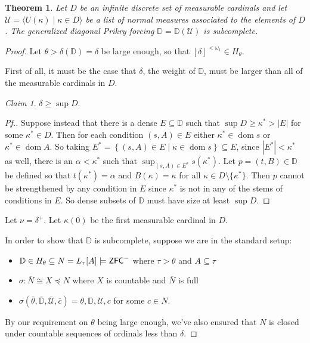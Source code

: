 \documentclass{amsart}
\newtheorem{theorem}{Theorem}[section]
\theoremstyle{definition}
\theoremstyle{remark}
\newtheorem{claimno}{Claim}
\newcommand{\D}{\mathbb{D}}
\newcommand{\N}{{\overline{N}}}
\newcommand{\U}{\mathcal{U}}
\newcommand{\ZFC}{\textup{\ensuremath{\textsf{ZFC}}}}
\DeclareMathOperator{\otp}{otp}
\DeclareMathOperator{\dom}{dom}
\newcommand{\st}{\; | \;}
\newcommand{\set}[2]{\left\{#1\st #2 \right\}}
\begin{document}
\begin{theorem} Let $D$ be an infinite discrete set of measurable cardinals %
and let $\U = \langle U(\kappa) \;|\; \kappa \in D \rangle$ be a list of normal measures associated to the
elements of $D$. 
The generalized diagonal Prikry forcing $\D=\D(\U)$ is subcomplete. \end{theorem}
\begin{proof} 
Let $\theta > \delta(\D) =\delta$ be large enough, so that $[\delta]^{<\omega_1} \in H_\theta$. 

First of all, it must be the case that $\delta$, the weight of $\D$, must be larger than all of the measurable cardinals in $D$.
\begin{claimno} $\delta \geq \sup D$. \end{claimno}
\begin{proof}[Pf.] Suppose instead that there is a dense $E \subseteq \D$ such that $\sup D \geq \kappa^* >|E|$ for some $\kappa^* \in D$. Then for each condition $(s,A) \in E$ either $\kappa^* \in \dom s$ or $\kappa^* \in \dom A$. So taking $E^*=\set{ (s, A) \in E }{ \kappa \in \dom s } \subseteq E$, since $|E^*| < \kappa^*$ as well, there is an $\alpha<\kappa^*$ such that $\sup_{(s,A) \in E^*} s(\kappa^*)$. Let $p=(t, B) \in \D$ be defined so that $t(\kappa^*)=\alpha$ and $B(\kappa)=\kappa$ for all $\kappa \in D \setminus \{ \kappa^*\}$. Then $p$ cannot be strengthened by any condition in $E$ since $\kappa^*$ is not in any of the stems of conditions in $E$. So dense subsets of $\D$ must have size at least $\sup D$.\end{proof}

Let $\nu = \delta^+$. Let $\kappa(0)$ be the first measurable cardinal in $D$. %

In order to show that $\D$ is subcomplete, suppose we are in the standard setup: \begin{itemize}
	\item $\D \in H_\theta \subseteq N = L_\tau[A] \models \ZFC^-$ where $\tau>\theta$ and $A \subseteq \tau$
	\item $\sigma: \N \cong X \preccurlyeq N$ where $X$ is countable and $\N$ is full
	\item $\sigma(\overline \theta, \overline{\D}, \overline{\U}, \overline c)=\theta, \D, \U, c$ for some $c \in N$.
\end{itemize}
By our requirement on $\theta$ being large enough, we've also ensured that $N$ is closed under countable sequences of ordinals less than $\delta$.


\end{proof}
\end{document}
